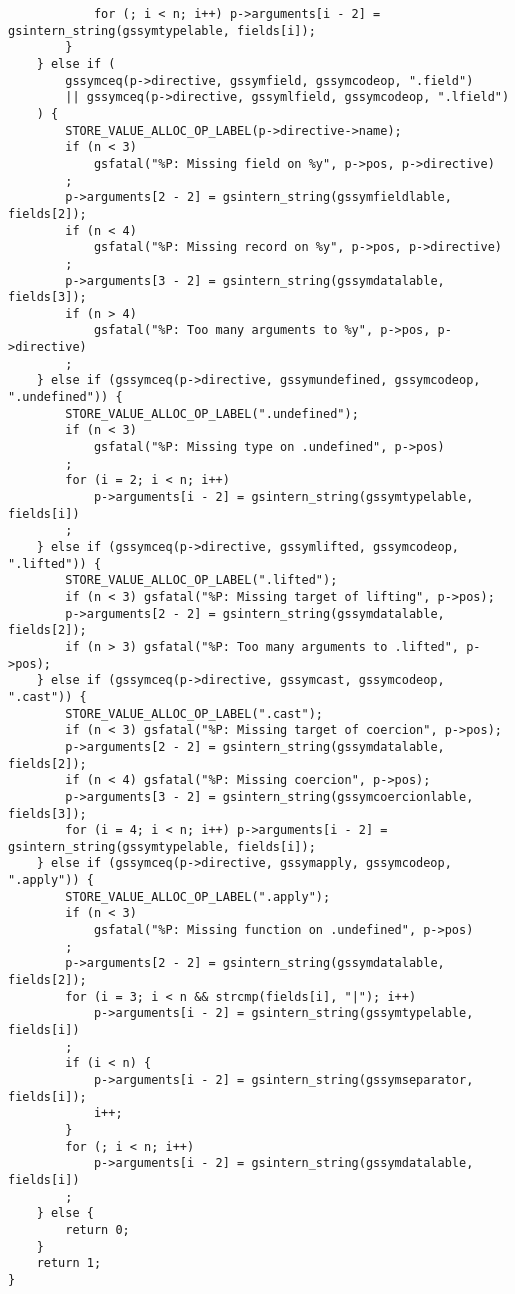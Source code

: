 \documentclass{report}
\begin{document}
\begin{verbatim}
            for (; i < n; i++) p->arguments[i - 2] = gsintern_string(gssymtypelable, fields[i]);
        }
    } else if (
        gssymceq(p->directive, gssymfield, gssymcodeop, ".field")
        || gssymceq(p->directive, gssymlfield, gssymcodeop, ".lfield")
    ) {
        STORE_VALUE_ALLOC_OP_LABEL(p->directive->name);
        if (n < 3)
            gsfatal("%P: Missing field on %y", p->pos, p->directive)
        ;
        p->arguments[2 - 2] = gsintern_string(gssymfieldlable, fields[2]);
        if (n < 4)
            gsfatal("%P: Missing record on %y", p->pos, p->directive)
        ;
        p->arguments[3 - 2] = gsintern_string(gssymdatalable, fields[3]);
        if (n > 4)
            gsfatal("%P: Too many arguments to %y", p->pos, p->directive)
        ;
    } else if (gssymceq(p->directive, gssymundefined, gssymcodeop, ".undefined")) {
        STORE_VALUE_ALLOC_OP_LABEL(".undefined");
        if (n < 3)
            gsfatal("%P: Missing type on .undefined", p->pos)
        ;
        for (i = 2; i < n; i++)
            p->arguments[i - 2] = gsintern_string(gssymtypelable, fields[i])
        ;
    } else if (gssymceq(p->directive, gssymlifted, gssymcodeop, ".lifted")) {
        STORE_VALUE_ALLOC_OP_LABEL(".lifted");
        if (n < 3) gsfatal("%P: Missing target of lifting", p->pos);
        p->arguments[2 - 2] = gsintern_string(gssymdatalable, fields[2]);
        if (n > 3) gsfatal("%P: Too many arguments to .lifted", p->pos);
    } else if (gssymceq(p->directive, gssymcast, gssymcodeop, ".cast")) {
        STORE_VALUE_ALLOC_OP_LABEL(".cast");
        if (n < 3) gsfatal("%P: Missing target of coercion", p->pos);
        p->arguments[2 - 2] = gsintern_string(gssymdatalable, fields[2]);
        if (n < 4) gsfatal("%P: Missing coercion", p->pos);
        p->arguments[3 - 2] = gsintern_string(gssymcoercionlable, fields[3]);
        for (i = 4; i < n; i++) p->arguments[i - 2] = gsintern_string(gssymtypelable, fields[i]);
    } else if (gssymceq(p->directive, gssymapply, gssymcodeop, ".apply")) {
        STORE_VALUE_ALLOC_OP_LABEL(".apply");
        if (n < 3)
            gsfatal("%P: Missing function on .undefined", p->pos)
        ;
        p->arguments[2 - 2] = gsintern_string(gssymdatalable, fields[2]);
        for (i = 3; i < n && strcmp(fields[i], "|"); i++)
            p->arguments[i - 2] = gsintern_string(gssymtypelable, fields[i])
        ;
        if (i < n) {
            p->arguments[i - 2] = gsintern_string(gssymseparator, fields[i]);
            i++;
        }
        for (; i < n; i++)
            p->arguments[i - 2] = gsintern_string(gssymdatalable, fields[i])
        ;
    } else {
        return 0;
    }
    return 1;
}


\end{verbatim}
\end{document}
